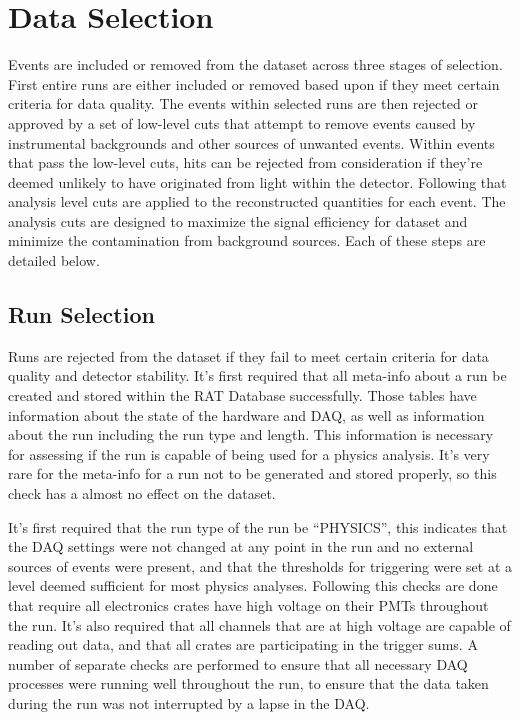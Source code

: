\section{Data Selection}
Events are included or removed from the dataset across three stages of selection.
First entire runs are either included or removed based upon if they meet
certain criteria for data quality.
The events within selected runs are then rejected or approved by a set
of low-level cuts that attempt to remove events caused by instrumental
backgrounds and other sources of unwanted events.
Within events that pass the low-level cuts, hits can be rejected from consideration
if they're deemed unlikely to have originated from light within the detector.
Following that analysis level cuts are applied to the reconstructed quantities
for each event.
The analysis cuts are designed to maximize the signal efficiency for dataset and minimize the
contamination from background sources.
Each of these steps are detailed below.

\subsection{Run Selection}
Runs are rejected from the dataset if they fail to meet certain criteria
for data quality and detector stability.
It's first required that all meta-info about a run be created and stored
within the RAT Database successfully.
Those tables have information about the state of the hardware and DAQ, as
well as information about the run including the run type and length.
This information is necessary for assessing if the run is capable of being
used for a physics analysis.
It's very rare for the meta-info for a run not to be generated and stored
properly, so this check has a almost no effect on the dataset.


It's first required that the run type of the run be ``PHYSICS'', this indicates
that the DAQ settings were not changed at any point in the run and no external
sources of events were present, and that the thresholds for triggering were set
at a level deemed sufficient for most physics analyses.
Following this checks are done
that require all electronics crates have high voltage on their PMTs throughout
the run.
It's also required that all channels that are at high voltage are capable of
reading out data, and that all crates are participating in the trigger sums.
A number of separate checks are performed to ensure that all necessary DAQ
processes were running well throughout the run, to ensure that the data taken
during the run was not interrupted by a lapse in the DAQ.\@

